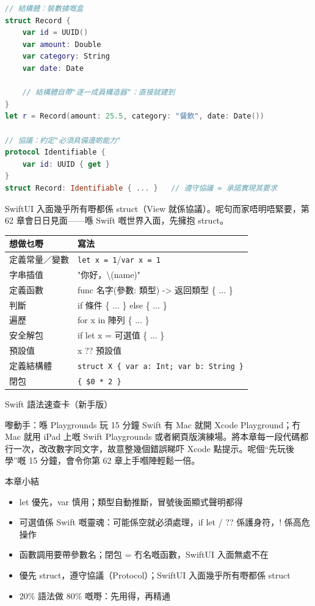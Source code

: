 \begin{lstlisting}[language=Swift]
// 結構體：裝數據嘅盒
struct Record {
    var id = UUID()
    var amount: Double
    var category: String
    var date: Date

    // 結構體自帶"逐一成員構造器"：直接就建到
}
let r = Record(amount: 25.5, category: "餐飲", date: Date())

// 協議：約定"必須具備邊啲能力"
protocol Identifiable {
    var id: UUID { get }
}
struct Record: Identifiable { ... }   // 遵守協議 = 承諾實現其要求
\end{lstlisting}

SwiftUI 入面幾乎所有嘢都係 struct（View 就係協議）。呢句而家唔明唔緊要，第 62 章會日日見面——喺 Swift 嘅世界入面，先擁抱 struct。


\begin{center}
\begin{tabularx}{\linewidth}{|X|X|}
\hline
\textbf{想做乜嘢} & \textbf{寫法} \tabularnewline
\hline
定義常量／變數 & \texttt{let x = 1}/\texttt{var x = 1} \tabularnewline
字串插值 & "你好，\textbackslash{}(name)" \tabularnewline
定義函數 & func 名字(參數: 類型) -> 返回類型 \{ ... \} \tabularnewline
判斷 & if 條件 \{ ... \} else \{ ... \} \tabularnewline
遍歷 & for x in 陣列 \{ ... \} \tabularnewline
安全解包 & if let x = 可選值 \{ ... \} \tabularnewline
預設值 & x ?? 預設值 \tabularnewline
定義結構體 & \texttt{struct X \{ var a: Int; var b: String \}} \tabularnewline
閉包 & \texttt{\{ \$0 * 2 \}} \tabularnewline
\hline
\end{tabularx}
\end{center}

\begin{center}\small\color{gray}Swift 語法速查卡（新手版）\end{center}

\begin{tcbpractice}{嚟動手：喺 Playgrounds 玩 15 分鐘 Swift}
有 Mac 就開 Xcode Playground；冇 Mac 就用 iPad 上嘅 Swift Playgrounds 或者網頁版演練場。將本章每一段代碼都行一次，改改數字同文字，故意整幾個錯誤睇吓 Xcode 點提示。呢個“先玩後學”嘅 15 分鐘，會令你第 62 章上手嗰陣輕鬆一倍。

\end{tcbpractice}

\begin{tcbsummary}{本章小結}
\begin{itemize}
  \item let 優先，var 慎用；類型自動推斷，冒號後面顯式聲明都得
  \item 可選值係 Swift 嘅靈魂：可能係空就必須處理，if let / ?? 係護身符，! 係高危操作
  \item 函數調用要帶參數名；閉包 = 冇名嘅函數，SwiftUI 入面無處不在
  \item 優先 struct，遵守協議（Protocol）；SwiftUI 入面幾乎所有嘢都係 struct
  \item 20\% 語法做 80\% 嘅嘢：先用得，再精通
\end{itemize}

\end{tcbsummary}
